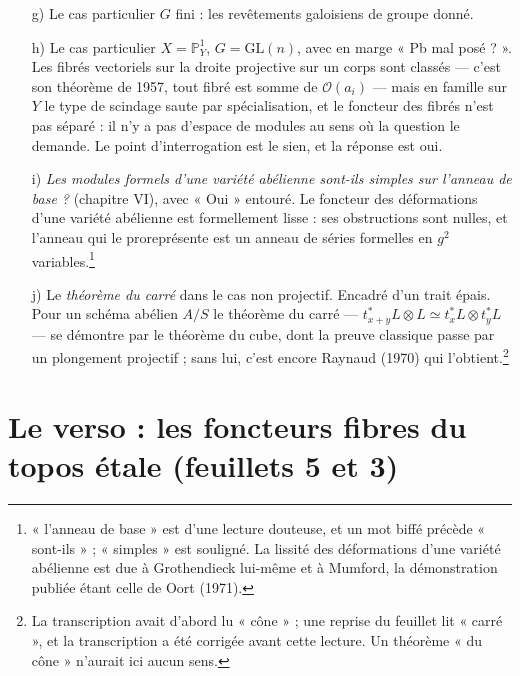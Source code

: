 \documentclass[11pt,a4paper]{article}
\begin{document}
\begin{enumerate}
  \ldots ».\footnote{Le dernier mot de la marge n'a pas été lu ; « pour » est
  d'une lecture douteuse. Les noms sont ceux des fibrés stables sur une courbe
  (Mumford 1963, Narasimhan et Seshadri 1965). Un « § 17 », entouré, est relié
  d'un trait à la ligne « $G$ commutatif » et à g).}
  \item[g)] Le cas particulier $G$ fini : les revêtements galoisiens de
  groupe donné.
  \item[h)] Le cas particulier $X = \mathbb{P}^{1}_{Y}$, $G = \mathrm{GL}(n)$,
  avec en marge « Pb mal posé ? ». Les fibrés vectoriels sur la droite
  projective sur un corps sont classés — c'est son théorème de 1957, tout
  fibré est somme de $\mathcal{O}(a_i)$ — mais en famille sur $Y$ le type de
  scindage saute par spécialisation, et le foncteur des fibrés n'est pas
  séparé : il n'y a pas d'espace de modules au sens où la question le
  demande. Le point d'interrogation est le sien, et la réponse est oui.
  \item[i)] \emph{Les modules formels d'une variété abélienne sont-ils simples
  sur l'anneau de base ?} (chapitre VI), avec « Oui » entouré. Le foncteur
  des déformations d'une variété abélienne est formellement lisse : ses
  obstructions sont nulles, et l'anneau qui le proreprésente est un anneau de
  séries formelles en $g^2$ variables.\footnote{« l'anneau de base » est
  d'une lecture douteuse, et un mot biffé précède « sont-ils » ; « simples »
  est souligné. La lissité des déformations d'une variété abélienne est due à
  Grothendieck lui-même et à Mumford, la démonstration publiée étant celle de
  Oort (1971).}
  \item[j)] Le \emph{théorème du carré} dans le cas non projectif. Encadré
  d'un trait épais. Pour un schéma abélien $A/S$ le théorème du carré —
  $t_{x+y}^{*}L \otimes L \simeq t_x^{*}L \otimes t_y^{*}L$ — se démontre par
  le théorème du cube, dont la preuve classique passe par un plongement
  projectif ; sans lui, c'est encore Raynaud (1970) qui l'obtient.\footnote{La
  transcription avait d'abord lu « cône » ; une reprise du feuillet lit
  « carré », et la transcription a été corrigée avant cette lecture. Un
  théorème « du cône » n'aurait ici aucun sens.}
\end{enumerate}

\section*{Le verso : les foncteurs fibres du topos étale (feuillets 5 et 3)}
\end{document}

